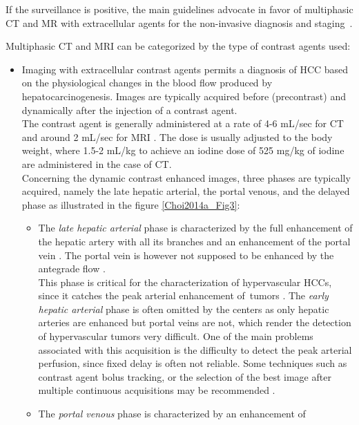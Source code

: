 If the surveillance is positive, the main guidelines advocate in favor
of multiphasic CT and MR with extracellular agents for the non-invasive
diagnosis and staging \cite{Kudo2010, Llovet2012, Omata2010, Bruix2011}.

Multiphasic CT and MRI can be categorized by the type of contrast agents
used:

\begin{itemize}
\item Imaging with extracellular contrast agents permits a diagnosis of
  HCC based on the physiological changes in the blood flow
  produced by hepatocarcinogenesis. Images are typically acquired before (precontrast) and dynamically
  after the injection of a contrast agent.\\
  The contrast agent is generally administered at a rate of 4-6 mL/sec
  for CT and around 2 mL/sec for MRI \cite{Schima2005, Frydrychowicz2012}. The dose is usually adjusted to the body weight, where 1.5-2
  mL/kg to achieve an iodine dose of 525 mg/kg of iodine are
  administered in the case of CT.\\
  Concerning the dynamic contrast enhanced images, three phases are
  typically acquired, namely the late hepatic arterial, the portal
  venous, and the delayed phase as illustrated in the figure \ref{Choi2014a_Fig3}:
  \begin{itemize}
  \item The \emph{late hepatic arterial} phase is characterized by the full
    enhancement of the hepatic artery with all its branches and an
    enhancement of the portal vein \cite{Choi2014}.
    The portal vein is however not supposed to be enhanced by the
    antegrade flow \cite{Miraglia2007}.\\
    This phase is critical for the characterization of hypervascular
    HCCs, since it catches the peak arterial enhancement
    of~tumors \cite{Kim2006}. The \emph{early
    hepatic arterial} phase is often omitted by the centers as only
    hepatic arteries are enhanced but portal veins are not, which render
    the detection of hypervascular tumors very difficult. One of the
    main problems associated with this acquisition is the difficulty to
    detect the peak arterial perfusion, since fixed delay is often not
    reliable. Some techniques such as contrast agent bolus tracking, or
    the selection of the best image after multiple continuous
    acquisitions may be recommended \cite{Earls1997}.
  \item The \emph{portal venous} phase is characterized by an enhancement of

\end{itemize}
\end{itemize}
